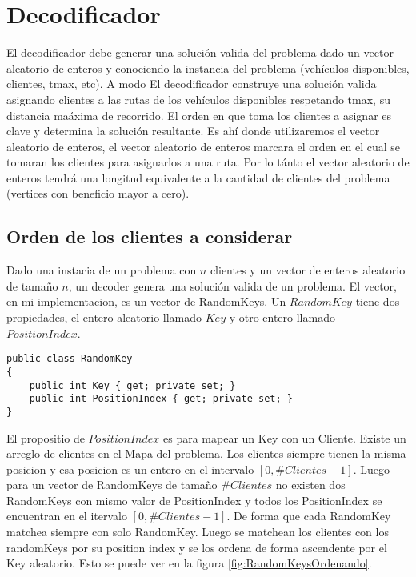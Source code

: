 \section{Decodificador}

El decodificador debe generar una solución valida del problema dado un vector aleatorio de enteros y conociendo la instancia del problema (vehículos disponibles, clientes, tmax, etc). A modo El decodificador construye una solución valida asignando clientes a las rutas de los vehículos disponibles respetando tmax, su distancia maáxima de recorrido. El orden en que toma los clientes a asignar es clave y determina la solución resultante. Es ahí donde utilizaremos el vector aleatorio de enteros, el vector aleatorio de enteros marcara el orden en el cual se tomaran los clientes para asignarlos a una ruta. Por lo tánto el vector aleatorio de enteros tendrá una longitud equivalente a la cantidad de clientes del problema (vertices con beneficio mayor a cero).

\subsection{Orden de los clientes a considerar}\label{sec:ordenDeco}

Dado una instacia de un problema con $n$ clientes y un vector de enteros aleatorio de tamaño $n$, un decoder genera una solución valida de un problema. El vector, en mi implementacion, es un vector de RandomKeys. Un $RandomKey$ tiene dos propiedades, el entero aleatorio llamado $Key$ y otro entero llamado $PositionIndex$. 

\bigskip

\begin{lstlisting} 
public class RandomKey
{        
	public int Key { get; private set; }
	public int PositionIndex { get; private set; }
}
\end{lstlisting}

\bigskip

El propositio de $PositionIndex$ es para mapear un Key con un Cliente. Existe un arreglo de clientes en el Mapa del problema. Los clientes siempre tienen la misma posicion y esa posicion es un entero en el intervalo $[0, \#Clientes-1]$. Luego para un vector de RandomKeys de tamaño $\#Clientes$ no existen dos RandomKeys con mismo valor de PositionIndex y todos los PositionIndex se encuentran en el itervalo $[0, \#Clientes-1]$. De forma que cada RandomKey matchea siempre con solo RandomKey. Luego se matchean los clientes con los randomKeys por su position index y se los ordena de forma ascendente por el Key aleatorio. Esto se puede ver en la figura \ref{fig:RandomKeysOrdenando}.

